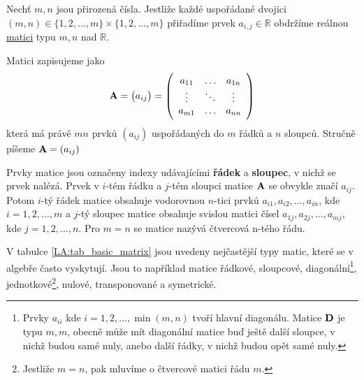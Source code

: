     \begin{definition}\label{def_matice}
      Nechť \(m, n\) jsou přirozená čísla. Jestliže každé uspořádané dvojici \((m,n)\in 
      \{1,2,\ldots,m\}\times \{1,2,\ldots,m\}\) přiřadíme prvek \(a_{i,j}\in\mathbb{R}\) obdržíme 
      reálnou \href{http://cs.wikipedia.org/wiki/Matice}{matici} typu \(m,n\) nad \(\mathbb{R}\). 
      
      Matici zapisujeme jako
      \begin{equation}\label{matice_zapis}
        \mathbf{A} = \left(a_{ij}\right) =\left(
                                      \begin{array}{ccc}
                                        a_{11} & \ldots & a_{1n} \\
                                        \vdots & \ddots & \vdots \\
                                        a_{m1} & \ldots & a_{nn}
                                      \end{array}
                                 \right)
      \end{equation}
      která má právě \(mn\) prvků \((a_{ij})\) uspořádaných do \(m\) řádků a \(n\) sloupců. Stručně 
      píšeme \(\mathbf{A} = (a_{ij})\)
    \end{definition}

    Prvky matice jsou označeny indexy udávajícími \textbf{řádek} a \textbf{sloupec}, v nichž se 
    prvek nalézá. Prvek v \(i\)-tém řádku a \(j\)-tém sloupci matice \(\mathbf{A}\) se obvykle značí 
    \(a_{ij}\). Potom \(i\)-tý řádek matice  obsahuje vodorovnou \(n\)-tici prvků \(a_{i1}, 
    a_{i2}, \ldots,a_{in} \), kde \(i=  1,2,\ldots,m\) a \(j\)-tý sloupec matice obsahuje svislou 
    matici čísel \(a_{1j},a_{2j},\ldots,a_{mj}\), kde \(j = 1,2,\ldots,n\). Pro \(m = n\) se matice 
    nazývá čtvercová n-tého řádu. 
      
    

    V tabulce \ref{LA:tab_basic_matrix} jsou uvedeny nejčastější typy matic, které se v algebře 
    často vyskytují. Jsou to například matice řádkové, sloupcové, diagonální\footnote{Prvky 
    \(a_{ii}\) kde \(i=1,2,\ldots,\min(m,n)\) tvoří hlavní diagonálu. Matice \(\mathbf{D}\) je 
    typu \(m,m\), obecně může mít diagonální matice buď ještě další sloupce, v nichž budou samé 
    nuly, anebo další řádky, v nichž budou opět samé nuly.}, jednotkové\footnote{Jestliže \(m = 
    n\), pak mluvíme o čtvercové matici řádu \(m\).}, nulové, transponované a symetrické.

